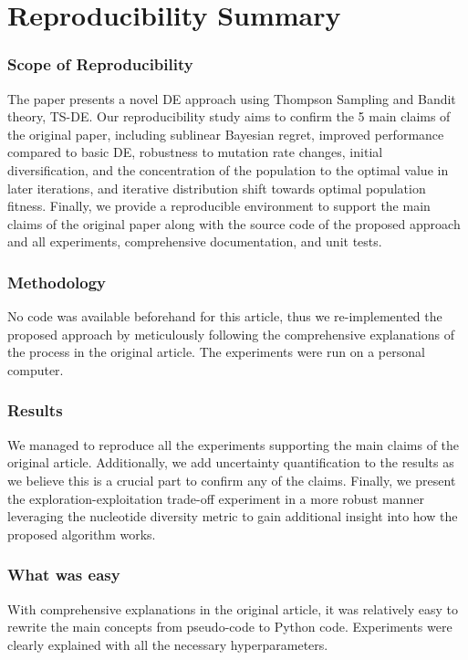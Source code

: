 \vspace{-1.5cm}
\section*{\centering Reproducibility Summary}

\subsubsection*{Scope of Reproducibility}

The paper presents a novel DE approach using Thompson Sampling and Bandit theory, TS-DE. Our reproducibility study aims to confirm the 5 main claims of the original paper, including sublinear Bayesian regret, improved performance compared to basic DE, robustness to mutation rate changes, initial diversification, and the concentration of the population to the optimal value in later iterations, and iterative distribution shift towards optimal population fitness. Finally, we provide a reproducible environment to support the main claims of the original paper along with the source code of the proposed approach and all experiments, comprehensive documentation, and unit tests.



\subsubsection*{Methodology}
No code was available beforehand for this article, thus we re-implemented the proposed approach by meticulously following the comprehensive explanations of the process in the original article. The experiments were run on a personal computer.

\subsubsection*{Results}
We managed to reproduce all the experiments supporting the main claims of the original article. Additionally, we add uncertainty quantification to the results as we believe this is a crucial part to confirm any of the claims. Finally, we present the exploration-exploitation trade-off experiment in a more robust manner leveraging the nucleotide diversity metric to gain additional insight into how the proposed algorithm works.


\subsubsection*{What was easy}
With comprehensive explanations in the original article, it was relatively easy to rewrite the main concepts from pseudo-code to Python code. Experiments were clearly explained with all the necessary hyperparameters.

